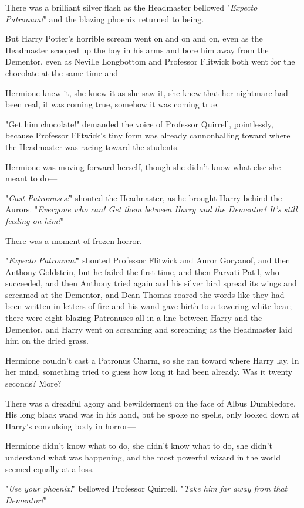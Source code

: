 There was a brilliant silver flash as the Headmaster bellowed "\emph{Expecto
Patronum!}" and the blazing phoenix returned to being.

But Harry Potter's horrible scream went on and on and on, even as the
Headmaster scooped up the boy in his arms and bore him away from the Dementor,
even as Neville Longbottom and Professor Flitwick both went for the chocolate
at the same time and---

Hermione knew it, she knew it as she saw it, she knew that her nightmare had
been real, it was coming true, somehow it was coming true.

"Get him chocolate!" demanded the voice of Professor Quirrell, pointlessly,
because Professor Flitwick's tiny form was already cannonballing toward where
the Headmaster was racing toward the students.

Hermione was moving forward herself, though she didn't know what else she meant
to do---

"\emph{Cast Patronuses!}" shouted the Headmaster, as he brought Harry behind
the Aurors. "\emph{Everyone who can! Get them between Harry and the Dementor!
It's still feeding on him!}"

There was a moment of frozen horror.

"\emph{Expecto Patronum!}" shouted Professor Flitwick and Auror Goryanof, and
then Anthony Goldstein, but he failed the first time, and then Parvati Patil,
who succeeded, and then Anthony tried again and his silver bird spread its
wings and screamed at the Dementor, and Dean Thomas roared the words like they
had been written in letters of fire and his wand gave birth to a towering white
bear; there were eight blazing Patronuses all in a line between Harry and the
Dementor, and Harry went on screaming and screaming as the Headmaster laid him
on the dried grass.

Hermione couldn't cast a Patronus Charm, so she ran toward where Harry lay. In
her mind, something tried to guess how long it had been already. Was it twenty
seconds? More?

There was a dreadful agony and bewilderment on the face of Albus Dumbledore.
His long black wand was in his hand, but he spoke no spells, only looked down
at Harry's convulsing body in horror---

Hermione didn't know what to do, she didn't know what to do, she didn't
understand what was happening, and the most powerful wizard in the world seemed
equally at a loss.

"\emph{Use your phoenix!}" bellowed Professor Quirrell. "\emph{Take him far
away from that Dementor!}"

